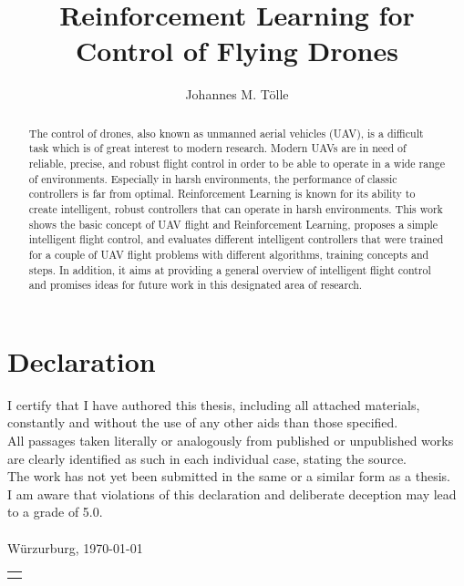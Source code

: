 \documentclass[bachelor,english]{infothesis}
\title{Reinforcement Learning for Control of Flying Drones}
\author{Johannes M. Tölle}
\newenvironment{declaration}
{\chapter*{Declaration}}
{\clearpage}
\begin{document}
\newpage 
\thispagestyle{empty}
\quad 
\newpage
{}
	
\begin{declaration}
	I certify that I have authored this thesis, including all attached materials,
	constantly and without the use of any other aids than those specified.\\
	All passages taken literally or analogously from published or unpublished works
	are clearly identified as such in each individual case, stating the source.\\
	The work has not yet been submitted in the same or a similar form as a thesis.\\
	I am aware that violations of this declaration and deliberate deception may lead to
	a grade of 5.0.\\
	\vspace*{12cm}\\
	Würzurburg, \today 
	\hspace*{\fill}\begin{tabular}{@{}l@{}}\hline
	\makebox[4cm]{Johannes M. Tölle}
	\end{tabular}
\end{declaration}

\tableofcontents
\listoffigures
\listoftables
\listofalgorithms

\newpage 
\thispagestyle{empty}
\quad 
\newpage

\begin{abstract}
	The control of drones, also known as unmanned aerial vehicles (UAV), 
	is a difficult task which is of great interest to modern research.
	Modern UAVs are in need of reliable, precise, and robust flight control in order to
	be able to operate in a wide range of environments. Especially in harsh environments,
	the performance of classic controllers is far from optimal.
	Reinforcement Learning is known for its ability to create intelligent, robust
	controllers that can operate in harsh environments.
	This work shows the basic concept of UAV flight and Reinforcement Learning,
	proposes a simple intelligent flight control,
	and evaluates different intelligent controllers that were trained for
	a couple of UAV flight problems with different algorithms, training concepts 
	and steps.
	In addition, it aims at providing a general overview of intelligent flight
	control and promises ideas for future work in this designated area of research.
\end{abstract}
\end{document}
